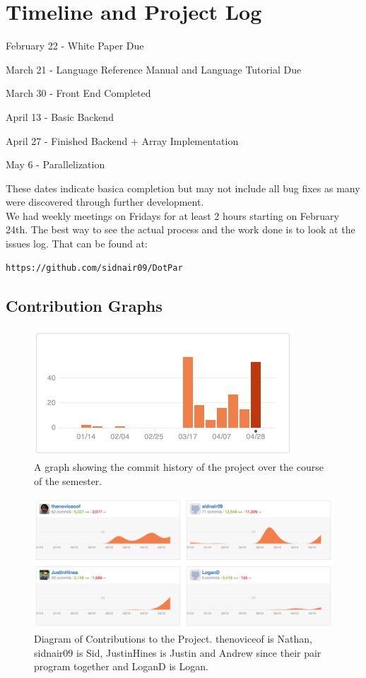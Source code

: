 \section{Timeline and Project Log}
\begin{description}
\item{February 22} - White Paper Due
\item{March 21} - Language Reference Manual and Language Tutorial Due
\item{March 30} - Front End Completed
\item{April 13} - Basic Backend
\item{April 27} - Finished Backend + Array Implementation
\item{May 6} - Parallelization
\end{description}
These dates indicate basica completion but may not include all bug fixes as many were discovered through further development.
\\ 
We had weekly meetings on Fridays for at least 2 hours starting on February 24th.
The best way to see the actual process and the work done is to look at the issues log. That can be found at:
\begin{verbatim}
https://github.com/sidnair09/DotPar
\end{verbatim} 
\subsection{Contribution Graphs}
\begin{figure}[H]
\centering
\includegraphics[scale=.5]{history.png}
\caption{A graph showing the commit history of the project over the course of the semester.}
\end{figure}

\begin{figure}[H]
\centering
\includegraphics[width=\textwidth]{Contribution.png}
\caption{Diagram of Contributions to the Project. thenoviceof is Nathan, sidnair09 is Sid, JustinHines is Justin and Andrew since their pair program together and LoganD is Logan.}
\end{figure}
